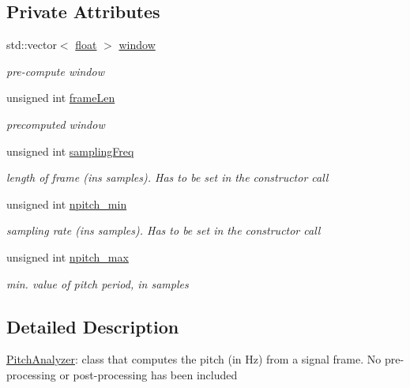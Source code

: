 \subsection*{Private Attributes}
\begin{DoxyCompactItemize}
\item 
std\+::vector$<$ \hyperlink{FFTReal__readme_8txt_a0ea2fae2a8106200bf378b90eae003cf}{float} $>$ \hyperlink{classupc_1_1PitchAnalyzer_aa9531a6af11904dca47a18cc22c4bcdd}{window}
\begin{DoxyCompactList}\small\item\em pre-\/compute window \end{DoxyCompactList}\item 
unsigned int \hyperlink{classupc_1_1PitchAnalyzer_a6ef737140140ec94f7be345804f28c73}{frame\+Len}
\begin{DoxyCompactList}\small\item\em precomputed window \end{DoxyCompactList}\item 
unsigned int \hyperlink{classupc_1_1PitchAnalyzer_a92578165c78c763749ef5c8aa23b1ca2}{sampling\+Freq}
\begin{DoxyCompactList}\small\item\em length of frame (ins samples). Has to be set in the constructor call \end{DoxyCompactList}\item 
unsigned int \hyperlink{classupc_1_1PitchAnalyzer_a3bb67370dbd69fade6be12fdae510eed}{npitch\+\_\+min}
\begin{DoxyCompactList}\small\item\em sampling rate (ins samples). Has to be set in the constructor call \end{DoxyCompactList}\item 
unsigned int \hyperlink{classupc_1_1PitchAnalyzer_a63d4cf285fa5f7a4e579ac2e02d36dd2}{npitch\+\_\+max}
\begin{DoxyCompactList}\small\item\em min. value of pitch period, in samples \end{DoxyCompactList}\end{DoxyCompactItemize}


\subsection{Detailed Description}
\hyperlink{classupc_1_1PitchAnalyzer}{Pitch\+Analyzer}\+: class that computes the pitch (in Hz) from a signal frame. No pre-\/processing or post-\/processing has been included 

